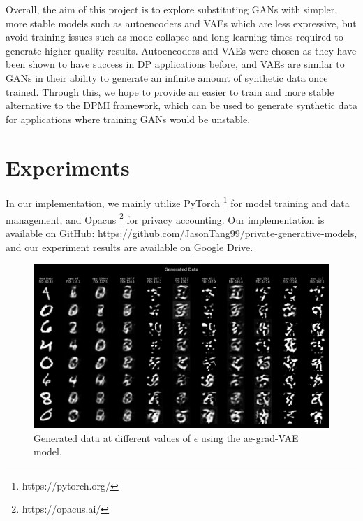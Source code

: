 \documentclass{article}
\begin{document}
Overall, the aim of this project is to explore substituting GANs with simpler, more stable models such as autoencoders and VAEs which are less expressive, but avoid training issues such as mode collapse and long learning times required to generate higher quality results. Autoencoders and VAEs were chosen as they have been shown to have success in DP applications \cite{dp_gen} before, and VAEs are similar to GANs in their ability to generate an infinite amount of synthetic data once trained. Through this, we hope to provide an easier to train and more stable alternative to the DPMI framework, which can be used to generate synthetic data for applications where training GANs would be unstable.



\section{Experiments}
In our implementation, we mainly utilize PyTorch \footnote{https://pytorch.org/} for model training and data management, and Opacus \footnote{https://opacus.ai/} \cite{opacus} for privacy accounting. Our implementation is available on GitHub: \url{https://github.com/JasonTang99/private-generative-models}, and our experiment results are available on \href{https://drive.google.com/file/d/1esmQm1gU3tqJppAE56oRRpXia4CMu4Sc/view?usp=drive_link}{Google Drive}.

\begin{figure}[!h]
    \centering
    \includegraphics[width=\columnwidth]{images/generated_data.png}
    \caption{Generated data at different values of $\epsilon$ using the ae-grad-VAE model.}
    \label{fig:generated_data}
\end{figure}
\end{document}
